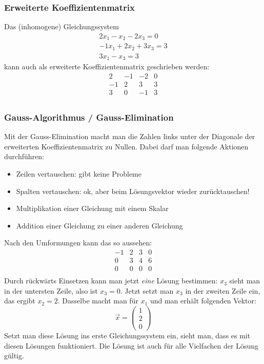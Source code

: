 \subsubsection{Erweiterte Koeffizientenmatrix}
Das (inhomogene) Gleichungssystem
\begin{align}
   2x_1 - x_2 - 2x_3 = 0 \\
   -1x_1 + 2x_2 + 3x_3 = 3 \\
   3x_1 - x_3 = 3
\end{align}
kann auch als erweiterte Koeffizientenmatrix geschrieben werden:
\[ \begin{array}{rrrr}
2   &   -1    & -2    & 0   \\
-1  &   2     & 3     & 3   \\
3   &   0     & -1    & 3   \\
\end {array} \]

\subsubsection{Gauss-Algorithmus / Gauss-Elimination}
Mit der Gauss-Elimination macht man die Zahlen links unter der Diagonale
der erweiterten Koeffizientenmatrix zu Nullen. Dabei darf man folgende
Aktionen durchführen:
\begin{itemize}
  \item Zeilen vertauschen: gibt keine Probleme
  \item Spalten vertauschen: ok, aber beim Lösungsvektor wieder
    zurücktauschen!
  \item Multiplikation einer Gleichung mit einem Skalar
  \item Addition einer Gleichung zu einer anderen Gleichung
\end{itemize}
Nach den Umformungen kann das so aussehen:
\[ \begin{array}{rrrr}
  -1 & 2  & 3  & 0 \\
  0 & 3  & 4  & 6 \\
  0 & 0  & 0  & 0 \\
\end {array} \]
Durch rückwärts Einsetzen kann man jetzt \emph{eine} Lösung bestimmen:
$x_3$ sieht man in der untersten Zeile, also ist $x_3 = 0$. Jetzt setzt
man $x_3$ in der zweiten Zeile ein, das ergibt $x_2 = 2$. Dasselbe macht
man für $x_1$ und man erhält folgenden Vektor:
\[ \vec x = \left( \begin{array} {c} 1 \\ 2 \\  0 \end{array} \right) \]
Setzt man diese Lösung ins erste Gleichungssystem ein, sieht man, dass
es mit diesen Lösungen funktioniert. Die Lösung ist auch für alle
Vielfachen der Lösung gültig.

